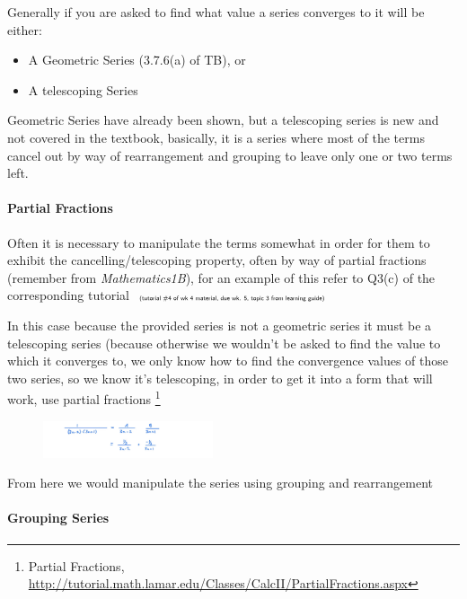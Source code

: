 \documentclass[class=article, crop=false]{standalone}
\begin{document}
Generally if you are asked to find what value a series converges to it
will be either:

\begin{itemize}
\item
  A Geometric Series (3.7.6(a) of TB), or
\item
  A telescoping Series
\end{itemize}

Geometric Series have already been shown, but a telescoping series is
new and not covered in the textbook, basically, it is a series where
most of the terms cancel out by way of rearrangement and grouping to
leave only one or two terms left.



\hypertarget{header-n3218}{%
\paragraph{Partial Fractions}\label{header-n3218}}

Often it is necessary to manipulate the terms somewhat in order for them
to exhibit the cancelling/telescoping property, often by way of partial
fractions (remember from \emph{Mathematics1B}), for an example of this
refer to Q3(c) of the corresponding tutorial
\(\tiny \textsf{(tutorial \#4 of wk 4 material, due wk. 5, topic 3 from learning guide)}\)

In this case because the provided series is not a geometric series it
must be a telescoping series (because otherwise we wouldn't be asked to
find the value to which it converges to, we only know how to find the
convergence values of those two series, so we know it's telescoping, in
order to get it into a form that will work, use partial fractions
\footnote{Partial Fractions,
  \href{Pauls\%20Calculus}{http://tutorial.math.lamar.edu/Classes/CalcII/PartialFractions.aspx}}

\begin{figure}
\centering
\includegraphics[width=5cm]{media/InfSeries/55CCA5D8-0B0A-438D-A991-6DB931F19D72.jpeg}
\caption{}
\end{figure}

From here we would manipulate the series using grouping and
rearrangement

\hypertarget{header-n3223}{%
\paragraph{Grouping Series}\label{header-n3223}}
\end{document}
